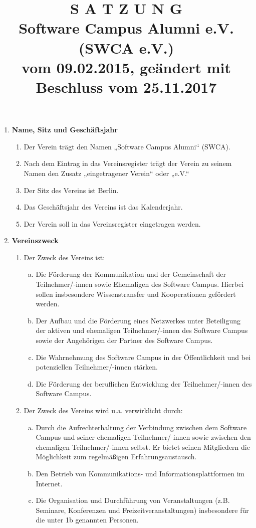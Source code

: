 \documentclass{article}
\title{\textsf{\textbf{S A T Z U N G}}\\
\small\textbf{Software Campus Alumni e.V. (SWCA e.V.)}\\
vom 09.02.2015, geändert mit Beschluss vom 25.11.2017}
\author{}
\date{}
\begin{document}
\maketitle

\begin{enumerate}[§ 1.]

\item \textsf{\textbf{Name, Sitz und Geschäftsjahr}}
	\begin{enumerate}[1.]
	\item Der Verein trägt den Namen „Software Campus Alumni“ (SWCA).
	\item Nach dem Eintrag in das Vereinsregister trägt der Verein zu seinem Namen den Zusatz „eingetragener Verein“ oder „e.V.“
	\item Der Sitz des Vereins ist Berlin.
	\item Das Geschäftsjahr des Vereins ist das Kalenderjahr.
	\item Der Verein soll in das Vereinsregister eingetragen werden.
	\end{enumerate}

\item \textsf{\textbf{Vereinszweck}}
	\begin{enumerate}[1.]
	\item Der Zweck des Vereins ist:	
		\begin{enumerate}[a.]
		\item Die Förderung der Kommunikation und der Gemeinschaft der Teilnehmer/-innen sowie Ehemaligen des Software Campus.
		Hierbei sollen insbesondere Wissenstransfer und Kooperationen gefördert
werden.
		\item Der Aufbau und die Förderung eines Netzwerkes unter Beteiligung der aktiven und ehemaligen Teilnehmer/-innen des Software Campus sowie der Angehörigen der Partner des Software Campus.
		\item Die Wahrnehmung des Software Campus in der Öffentlichkeit und bei potenziellen Teilnehmer/-innen stärken.
		\item Die Förderung der beruflichen Entwicklung der Teilnehmer/-innen des Software Campus.		
		\end{enumerate}

	\item Der Zweck des Vereins wird u.a. verwirklicht durch:
		\begin{enumerate}[a.]
		\item Durch die Aufrechterhaltung der Verbindung zwischen dem Software Campus und seiner ehemaligen Teilnehmer/-innen sowie zwischen den ehemaligen Teilnehmer/-innen selbst. Er bietet seinen Mitgliedern die Möglichkeit zum regelmäßigen Erfahrungsaustausch.
		\item Den Betrieb von Kommunikations- und Informationsplattformen im Internet.
		\item Die Organisation und Durchführung von Veranstaltungen (z.B. Seminare, Konferenzen und Freizeitveranstaltungen) insbesondere für die unter 1b genannten Personen.
		\end{enumerate}
	\end{enumerate}


\end{enumerate}
\end{document}
